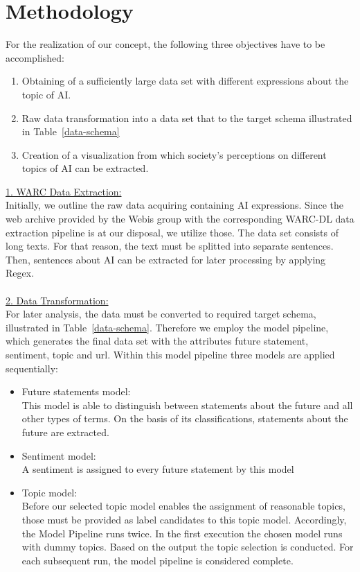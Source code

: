 \section{Methodology}

For the realization of our concept, the following three objectives have to be accomplished:

\begin{enumerate}
    \item Obtaining of a sufficiently large data set with different expressions about the topic of AI.
    \item Raw data transformation into a data set that to the target schema illustrated in Table~\ref{data-schema}
    \item Creation of a visualization from which society's perceptions on different topics of AI can be extracted.
\end{enumerate}%
%
%
\underline{1. WARC Data Extraction:}
\\
Initially, we outline the raw data acquiring containing AI expressions. 
Since the web archive provided by the Webis group with the corresponding WARC-DL data extraction pipeline \citep{Deckers2022} is at our disposal, we utilize those. 
The data set consists of long texts. 
For that reason, the text must be splitted into separate sentences. 
Then, sentences about AI can be extracted for later processing by applying Regex. 
\\
\\
%
\underline{2. Data Transformation:}
\\
For later analysis, the data must be converted to required target schema, illustrated in Table~\ref{data-schema}. Therefore we employ the model pipeline, which generates the final data set with the attributes future statement, sentiment, topic and url. Within this model pipeline three models are applied sequentially: 
\begin{itemize}
    \item Future statements model:\\
    This model is able to distinguish between statements about the future and all other types of terms. 
On the basis of its classifications, statements about the future are extracted.
    \item Sentiment model:\\
A sentiment is assigned to every future statement by this model
    \item Topic model: \\
    Before our selected topic model enables the assignment of reasonable topics, those must be provided as label candidates to this topic model.  
Accordingly, the Model Pipeline runs twice. In the first execution the chosen model runs with dummy topics. Based on the output the topic selection is conducted. 
For each subsequent run, the model pipeline is considered complete.
\end{itemize}

